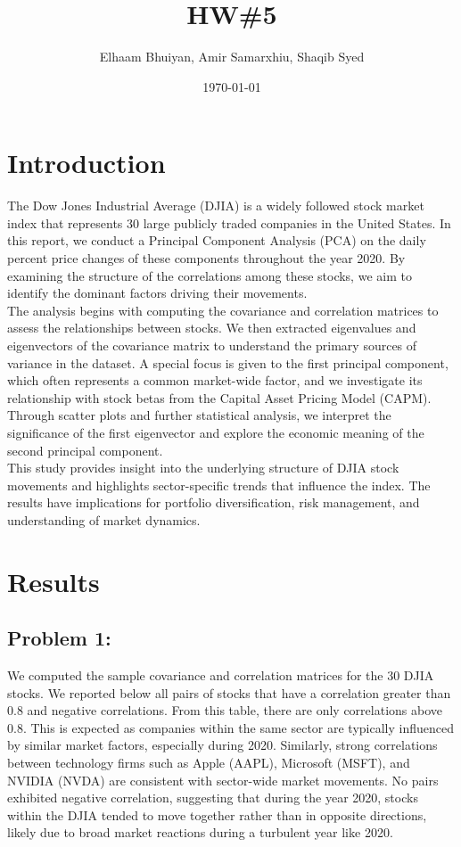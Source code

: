 \documentclass{report}
\title{HW\#5}
\author{
Elhaam Bhuiyan,
Amir Samarxhiu,
Shaqib Syed
}
\date{\today}
\begin{document}
\maketitle

\section*{Introduction}
The Dow Jones Industrial Average (DJIA) is a widely followed stock market index that represents 30 large publicly traded companies in the United States. In this report, we conduct a Principal Component Analysis (PCA) on the daily percent price changes of these components throughout the year 2020. By examining the structure of the correlations among these stocks, we aim to identify the dominant factors driving their movements. \\

The analysis begins with computing the covariance and correlation matrices to assess the relationships between stocks. We then extracted eigenvalues and eigenvectors of the covariance matrix to understand the primary sources of variance in the dataset. A special focus is given to the first principal component, which often represents a common market-wide factor, and we investigate its relationship with stock betas from the Capital Asset Pricing Model (CAPM). Through scatter plots and further statistical analysis, we interpret the significance of the first eigenvector and explore the economic meaning of the second principal component. \\

This study provides insight into the underlying structure of DJIA stock movements and highlights sector-specific trends that influence the index. The results have implications for portfolio diversification, risk management, and understanding of market dynamics. \\
\newpage

\section*{Results}

\subsection*{Problem 1:}
We computed the sample covariance and correlation matrices for the 30 DJIA stocks. We reported below all pairs of stocks that have a correlation greater than 0.8 and negative correlations. From this table, there are only correlations above 0.8. This is expected as companies within the same sector are typically influenced by similar market factors, especially during 2020. Similarly, strong correlations between technology firms such as Apple (AAPL), Microsoft (MSFT), and NVIDIA (NVDA) are consistent with sector-wide market movements. No pairs exhibited negative correlation, suggesting that during the year 2020, stocks within the DJIA tended to move together rather than in opposite directions, likely due to broad market reactions during a turbulent year like 2020. \\
\end{document}
